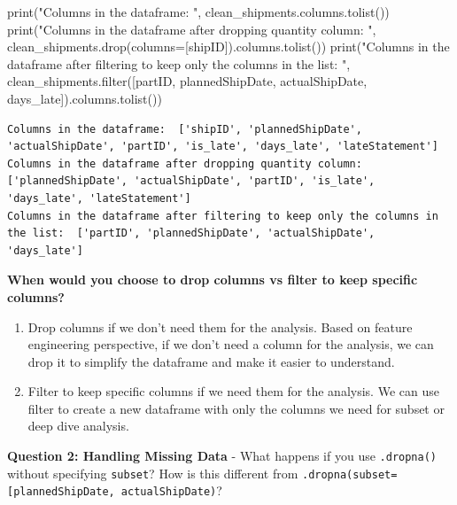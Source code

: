 \documentclass[
]{article}
\newenvironment{Shaded}{\begin{snugshade}}{\end{snugshade}}
\newcommand{\BuiltInTok}[1]{\textcolor[rgb]{0.00,0.23,0.31}{#1}}
\newcommand{\NormalTok}[1]{\textcolor[rgb]{0.00,0.23,0.31}{#1}}
\newcommand{\OperatorTok}[1]{\textcolor[rgb]{0.37,0.37,0.37}{#1}}
\newcommand{\StringTok}[1]{\textcolor[rgb]{0.13,0.47,0.30}{#1}}
\providecommand{\tightlist}{%
  \setlength{\itemsep}{0pt}\setlength{\parskip}{0pt}}
\begin{document}
\label{drop-vs-filter-strategies}
\begin{Shaded}
\begin{Highlighting}[]
\BuiltInTok{print}\NormalTok{(}\StringTok{"Columns in the dataframe: "}\NormalTok{, clean\_shipments.columns.tolist())}
\BuiltInTok{print}\NormalTok{(}\StringTok{"Columns in the dataframe after dropping quantity column: "}\NormalTok{, clean\_shipments.drop(columns}\OperatorTok{=}\NormalTok{[}\StringTok{\textquotesingle{}shipID\textquotesingle{}}\NormalTok{]).columns.tolist())}
\BuiltInTok{print}\NormalTok{(}\StringTok{"Columns in the dataframe after filtering to keep only the columns in the list: "}\NormalTok{, clean\_shipments.}\BuiltInTok{filter}\NormalTok{([}\StringTok{\textquotesingle{}partID\textquotesingle{}}\NormalTok{, }\StringTok{\textquotesingle{}plannedShipDate\textquotesingle{}}\NormalTok{, }\StringTok{\textquotesingle{}actualShipDate\textquotesingle{}}\NormalTok{, }\StringTok{\textquotesingle{}days\_late\textquotesingle{}}\NormalTok{]).columns.tolist())}
\end{Highlighting}
\end{Shaded}

\begin{verbatim}
Columns in the dataframe:  ['shipID', 'plannedShipDate', 'actualShipDate', 'partID', 'is_late', 'days_late', 'lateStatement']
Columns in the dataframe after dropping quantity column:  ['plannedShipDate', 'actualShipDate', 'partID', 'is_late', 'days_late', 'lateStatement']
Columns in the dataframe after filtering to keep only the columns in the list:  ['partID', 'plannedShipDate', 'actualShipDate', 'days_late']
\end{verbatim}

\textbf{When would you choose to drop columns vs filter to keep specific
columns?}

\begin{enumerate}
\def\labelenumi{\arabic{enumi}.}
\tightlist
\item
  Drop columns if we don't need them for the analysis. Based on feature
  engineering perspective, if we don't need a column for the analysis,
  we can drop it to simplify the dataframe and make it easier to
  understand.
\item
  Filter to keep specific columns if we need them for the analysis. We
  can use filter to create a new dataframe with only the columns we need
  for subset or deep dive analysis.
\end{enumerate}

\textbf{Question 2: Handling Missing Data} - What happens if you use
\texttt{.dropna()} without specifying \texttt{subset}? How is this
different from
\texttt{.dropna(subset={[}\textquotesingle{}plannedShipDate\textquotesingle{},\ \textquotesingle{}actualShipDate\textquotesingle{}{]})}?
\end{document}
